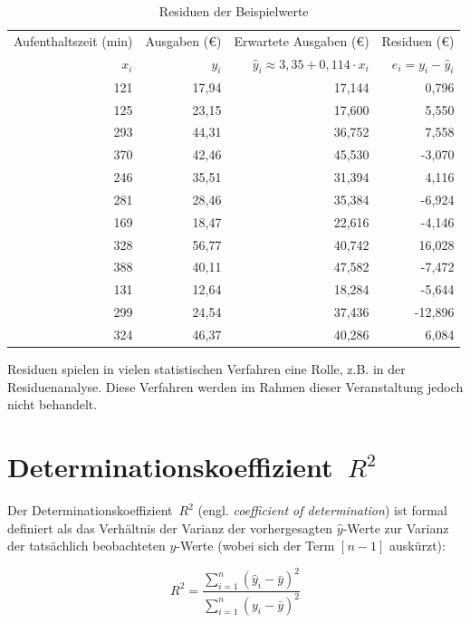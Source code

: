 \documentclass[
  11pt,
  ngerman,
  a4paper,
]{report}
\begin{document}
\begin{table}

\caption{\label{tab:res2}Residuen der Beispielwerte}
\centering
\begin{tabular}[t]{rrrr}
\toprule
\multicolumn{1}{c}{Aufenthaltszeit (min)} & \multicolumn{1}{c}{Ausgaben (€)} & \multicolumn{1}{c}{Erwartete Ausgaben (€)} & \multicolumn{1}{c}{Residuen (€)} \\
\cmidrule(l{3pt}r{3pt}){1-1} \cmidrule(l{3pt}r{3pt}){2-2} \cmidrule(l{3pt}r{3pt}){3-3} \cmidrule(l{3pt}r{3pt}){4-4}
$x_i$ & $y_i$ & $\hat{y}_i\approx3{,}35+0{,}114\cdot x_i$ & $e_i=y_i-\hat{y}_i$\\
\midrule
121 & 17,94 & 17,144 & 0,796\\
125 & 23,15 & 17,600 & 5,550\\
293 & 44,31 & 36,752 & 7,558\\
370 & 42,46 & 45,530 & -3,070\\
246 & 35,51 & 31,394 & 4,116\\
281 & 28,46 & 35,384 & -6,924\\
169 & 18,47 & 22,616 & -4,146\\
328 & 56,77 & 40,742 & 16,028\\
388 & 40,11 & 47,582 & -7,472\\
131 & 12,64 & 18,284 & -5,644\\
299 & 24,54 & 37,436 & -12,896\\
324 & 46,37 & 40,286 & 6,084\\
\bottomrule
\end{tabular}
\end{table}

Residuen spielen in vielen statistischen Verfahren eine Rolle, z.B. in der Residuenanalyse. Diese Verfahren werden im Rahmen dieser Veranstaltung jedoch nicht behandelt.

\hypertarget{determinationskoeffizient}{%
\section{\texorpdfstring{Determinationskoeffizient~\(R^2\)}{Determinationskoeffizient~R\^{}2}}\label{determinationskoeffizient}}

Der Determinationskoeffizient~\(R^2\) (engl. \emph{coefficient of determination}) ist formal definiert als das Verhältnis der Varianz der vorhergesagten \(\hat{y}\)-Werte zur Varianz der tatsächlich beobachteten \(y\)-Werte (wobei sich der Term \([n-1]\) auskürzt):

\[
R^2=\frac{\sum\limits^n_{i=1}(\hat{y}_i-\bar{y})^2}{\sum\limits^n_{i=1}(y_i-\bar{y})^2}
\label{eq:rsqformal}
\]
\end{document}
